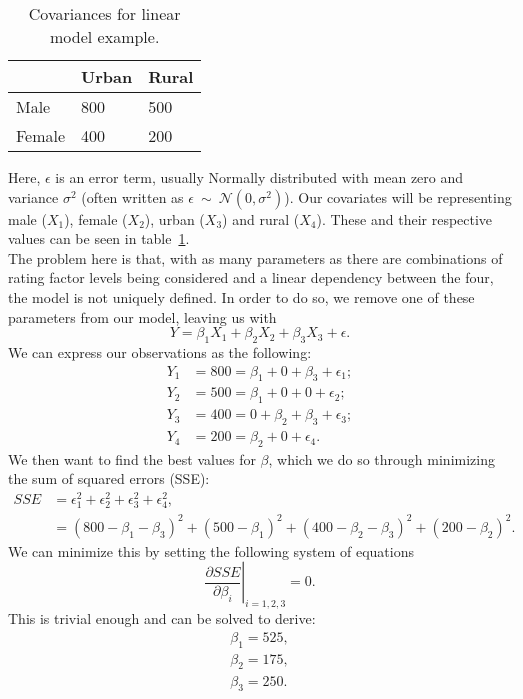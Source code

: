 \documentclass{article}
\begin{document}
\begin{table}[H]
\centering
\begin{tabular}{l|l|l|}
\cline{2-3}
                             & Urban & Rural \\ \hline
\multicolumn{1}{|l|}{Male}   & 800   & 500   \\ \hline
\multicolumn{1}{|l|}{Female} & 400   & 200   \\ \hline
\end{tabular}
    \caption{Covariances for linear model example.}
    \label{fig:covariances_example}
\end{table}

Here, $\epsilon$ is an error term, usually Normally distributed with mean zero and variance $\sigma^2$ (often written as $\epsilon~\sim~\mathcal{N}(0,\sigma^2)$). Our covariates will be representing male ($X_1$), female ($X_2$), urban ($X_3$) and rural ($X_4$). These and their respective values can be seen in table~\ref{fig:covariances_example}.\\
The problem here is that, with as many parameters as there are combinations of rating factor levels being considered and a linear dependency between the four, the model is not uniquely defined. In order to do so, we remove one of these parameters from our model, leaving us with
\begin{equation}
    Y = \beta_1X_1 + \beta_2X_2 + \beta_3X_3  + \epsilon. \label{eq:linear_model_1}
\end{equation}
We can express our observations as the following:
\begin{align}
    Y_1 &= 800 = \beta_1 + 0 + \beta_3 + \epsilon_1;\\
    Y_2 &= 500 = \beta_1 + 0 + 0 + \epsilon_2;\\
    Y_3 &= 400 = 0 + \beta_2 + \beta_3 + \epsilon_3;\\
    Y_4 &= 200 = \beta_2 + 0 + \epsilon_4.
\end{align}
We then want to find the best values for $\beta$, which we do so through minimizing the sum of squared errors (SSE):
\begin{align}
    SSE &= \epsilon_1^2 + \epsilon_2^2 + \epsilon_3^2 + \epsilon_4^2, \\
    &= (800-\beta_1-\beta_3)^2 + (500-\beta_1)^2 + (400-\beta_2 - \beta_3)^2 + (200-\beta_2)^2.
\end{align}
We can minimize this by setting the following system of equations
\begin{equation}
    \left.\frac{\partial SSE}{\partial \beta_i}\right\vert_{i=1,2,3} = 0.
\end{equation}
This is trivial enough and can be solved to derive:
\begin{align}
    \beta_1 = 525,\\
    \beta_2 = 175,\\
    \beta_3 = 250.
\end{align}
\end{document}
